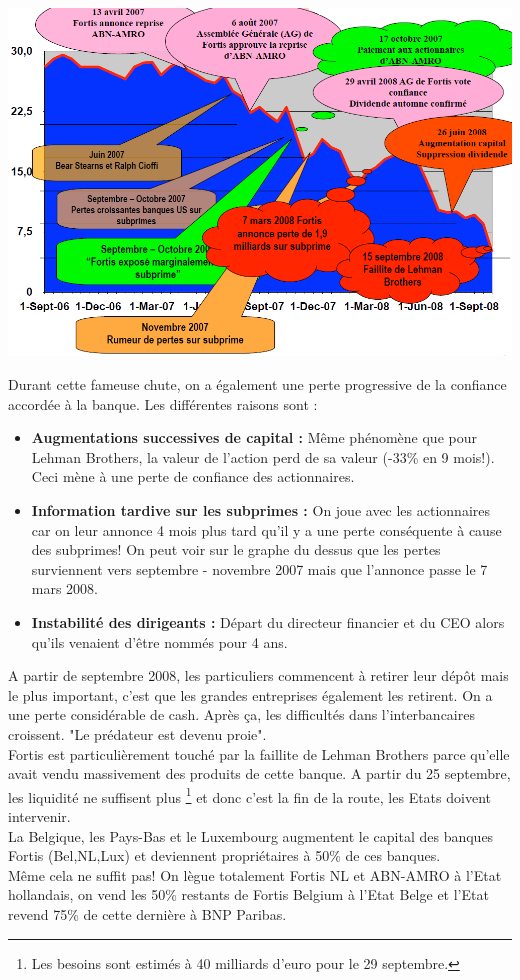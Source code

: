 \begin{center}
\includegraphics[scale=0.45]{13}
\end{center}

Durant cette fameuse chute, on a également une perte progressive de la confiance accordée à la banque. Les différentes raisons sont : 

\begin{itemize}
\item \textbf{Augmentations successives de capital :} Même phénomène que pour Lehman Brothers, la valeur de l'action perd de sa valeur (-33\% en 9 mois!). Ceci mène à une perte de confiance des actionnaires.

\item \textbf{Information tardive sur les subprimes :} On joue avec les actionnaires car on leur annonce 4 mois plus tard qu'il y a une perte conséquente à cause des subprimes! On peut voir sur le graphe du dessus que les pertes surviennent vers septembre - novembre 2007 mais que l'annonce passe le 7 mars 2008. 

\item \textbf{Instabilité des dirigeants :} Départ du directeur financier et du CEO alors qu'ils venaient d'être nommés pour 4 ans. 
\end{itemize}

A partir de septembre 2008, les particuliers commencent à retirer leur dépôt mais le plus important, c'est que les grandes entreprises également les retirent. On a une perte considérable de cash. Après ça, les difficultés dans l'interbancaires croissent. "Le prédateur est devenu proie". \\
Fortis est particulièrement touché par la faillite de Lehman Brothers parce qu'elle avait vendu massivement des produits de cette banque. A partir du 25 septembre, les liquidité ne suffisent plus \footnote{Les besoins sont estimés à 40 milliards d'euro pour le 29 septembre.} et donc c'est la fin de la route, les Etats doivent intervenir. \\
La Belgique, les Pays-Bas et le Luxembourg augmentent le capital des banques Fortis (Bel,NL,Lux) et deviennent propriétaires à 50\% de ces banques. \\
Même cela ne suffit pas! On lègue totalement Fortis NL et ABN-AMRO à l'Etat hollandais, on vend les 50\% restants de Fortis Belgium à l'Etat Belge et l'Etat revend 75\% de cette dernière à BNP Paribas.